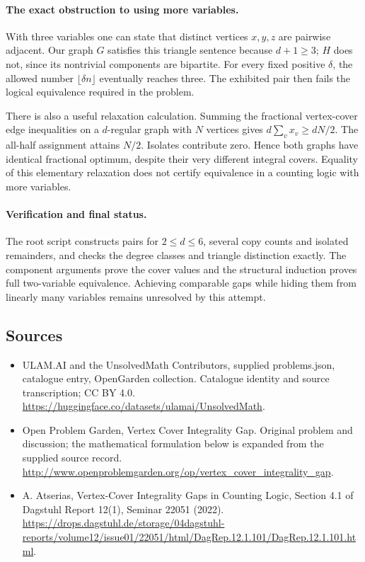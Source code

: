 \documentclass[11pt,a4paper]{article}
\begin{document}
\paragraph{The exact obstruction to using more variables.}
With three variables one can state that distinct
vertices $x,y,z$ are pairwise adjacent. Our graph $G$
satisfies this triangle sentence because $d+1\ge3$;
$H$ does not, since its nontrivial components are
bipartite. For every fixed positive $\delta$, the
allowed number $\lfloor\delta n\rfloor$ eventually
reaches three. The exhibited pair then fails the
logical equivalence required in the problem.

There is also a useful relaxation calculation. Summing
the fractional vertex-cover edge inequalities on a
$d$-regular graph with $N$ vertices gives
$d\sum_v x_v\ge dN/2$. The all-half assignment
attains $N/2$. Isolates contribute zero. Hence both
graphs have identical fractional optimum, despite
their very different integral covers. Equality of
this elementary relaxation does not certify equivalence
in a counting logic with more variables.

\paragraph{Verification and final status.}
The root script constructs pairs for $2\le d\le6$,
several copy counts and isolated remainders, and checks
the degree classes and triangle distinction exactly.
The component arguments prove the cover values and
the structural induction proves full two-variable
equivalence. Achieving comparable gaps while hiding
them from linearly many variables remains unresolved
by this attempt.

\subsection{Sources}
\begin{itemize}
\item[S1] ULAM.AI and the UnsolvedMath Contributors, supplied problems.json, catalogue entry, OpenGarden collection. Catalogue identity and source transcription; CC BY 4.0.
\url{https://huggingface.co/datasets/ulamai/UnsolvedMath}.
\item[S2] Open Problem Garden, Vertex Cover Integrality Gap. Original problem and discussion; the mathematical formulation below is expanded from the supplied source record.
\url{http://www.openproblemgarden.org/op/vertex_cover_integrality_gap}.

\item[R1] A. Atserias, Vertex-Cover Integrality Gaps in Counting Logic,
Section 4.1 of Dagstuhl Report 12(1), Seminar 22051 (2022).
\url{https://drops.dagstuhl.de/storage/04dagstuhl-reports/volume12/issue01/22051/html/DagRep.12.1.101/DagRep.12.1.101.html}.

\end{itemize}
\end{document}
